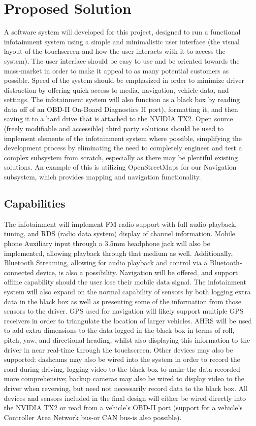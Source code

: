 \documentclass[onecolumn, draftclsnofoot,10pt, compsoc]{IEEEtran}
\begin{document}
\section{Proposed Solution}
A software system will developed for this project, designed to run a functional infotainment system using a simple and minimalistic user interface (the visual layout of the touchscreen and how the user interacts with it to access the system). The user interface should be easy to use and be oriented towards the mass-market in order to make it appeal to as many potential customers as possible. Speed of the system should be emphasized in order to minimize driver distraction by offering quick access to media, navigation, vehicle data, and settings. The infotainment system will also function as a black box by reading data off of an OBD-II On-Board Diagnostics II port), formatting it, and then saving it to a hard drive that is attached to the NVIDIA TX2. Open source (freely modifiable and accessible) third party solutions should be used to implement elements of the infotainment system where possible, simplifying the development process by eliminating the need to completely engineer and test a complex subsystem from scratch, especially as there may be plentiful existing solutions. An example of this is utilizing OpenStreetMaps for our Navigation subsystem, which provides mapping and navigation functionality.\par

\subsection{Capabilities}
The infotainment will implement FM radio support with full audio playback, tuning, and RDS (radio data system) display of channel information. Mobile phone Auxiliary input through a 3.5mm headphone jack will also be implemented, allowing playback through that medium as well. Additionally, Bluetooth Streaming, allowing for audio playback and control via a Bluetooth-connected device, is also a possibility. Navigation will be offered, and support offline capability should the user lose their mobile data signal. The infotainment system will also expand on the normal capability of sensors by both logging extra data in the black box as well as presenting some of the information from those sensors to the driver. GPS used for navigation will likely support multiple GPS receivers in order to triangulate the location of larger vehicles. AHRS will be used to add extra dimensions to the data logged in the black box in terms of roll, pitch, yaw, and directional heading, whilst also displaying this information to the driver in near real-time through the touchscreen. Other devices may also be supported: dashcams may also be wired into the system in order to record the road during driving, logging video to the black box to make the data recorded more comprehensive; backup cameras may also be wired to display video to the driver when reversing, but need not necessarily record data to the black box. All devices and sensors included in the final design will either be wired directly into the NVIDIA TX2 or read from a vehicle's OBD-II port (support for a vehicle's Controller Area Network bus\--or CAN bus\--is also possible).\par
\end{document}
